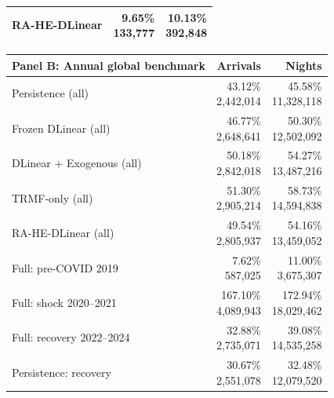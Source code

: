 \begin{table}[!t]
\begin{minipage}[t]{0.49\textwidth}
\begin{tabular}[t]{@{}lrr@{}}
RA-HE-DLinear & \shortstack{9.65\%\\133,777} & \shortstack{10.13\%\\392,848} \\
\bottomrule
\end{tabular}
\end{minipage}\hfill
\begin{minipage}[t]{0.49\textwidth}
\centering
\begin{tabular}[t]{@{}lrr@{}}
\toprule
\textbf{Panel B: Annual global benchmark} & \textbf{Arrivals} & \textbf{Nights} \\
\midrule
Persistence (all) & \shortstack{43.12\%\\2,442,014} & \shortstack{45.58\%\\11,328,118} \\
Frozen DLinear (all) & \shortstack{46.77\%\\2,648,641} & \shortstack{50.30\%\\12,502,092} \\
DLinear + Exogenous (all) & \shortstack{50.18\%\\2,842,018} & \shortstack{54.27\%\\13,487,216} \\
TRMF-only (all) & \shortstack{51.30\%\\2,905,214} & \shortstack{58.73\%\\14,594,838} \\
RA-HE-DLinear (all) & \shortstack{49.54\%\\2,805,937} & \shortstack{54.16\%\\13,459,052} \\
\midrule
Full: pre-COVID 2019 & \shortstack{7.62\%\\587,025} & \shortstack{11.00\%\\3,675,307} \\
Full: shock 2020--2021 & \shortstack{167.10\%\\4,089,943} & \shortstack{172.94\%\\18,029,462} \\
Full: recovery 2022--2024 & \shortstack{32.88\%\\2,735,071} & \shortstack{39.08\%\\14,535,258} \\
Persistence: recovery & \shortstack{30.67\%\\2,551,078} & \shortstack{32.48\%\\12,079,520} \\
\bottomrule
\end{tabular}

\end{minipage}
\end{table}
